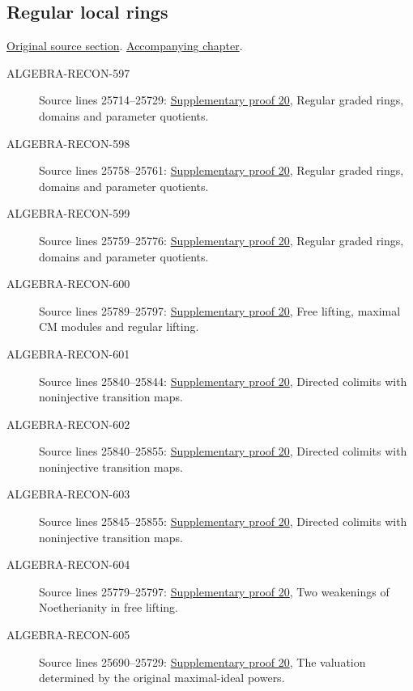\subsection{Regular local rings}
\hypertarget{algebra-source-section-regular}{}
\noindent\href{https://github.com/stacks/stacks-project/blob/a04446e57ec1fbc252a871afcec7752fb2807b14/algebra.tex\#L25679}{Original source section}. \href{algebra.pdf\#nameddest=section-regular}{Accompanying chapter}.

\begin{description}
\item[ALGEBRA-RECON-597] Source lines 25714--25729: \hyperlink{algebra_catenary_regular_notes_20260928}{Supplementary proof 20}, Regular graded rings, domains and parameter quotients.
\item[ALGEBRA-RECON-598] Source lines 25758--25761: \hyperlink{algebra_catenary_regular_notes_20260928}{Supplementary proof 20}, Regular graded rings, domains and parameter quotients.
\item[ALGEBRA-RECON-599] Source lines 25759--25776: \hyperlink{algebra_catenary_regular_notes_20260928}{Supplementary proof 20}, Regular graded rings, domains and parameter quotients.
\item[ALGEBRA-RECON-600] Source lines 25789--25797: \hyperlink{algebra_catenary_regular_notes_20260928}{Supplementary proof 20}, Free lifting, maximal CM modules and regular lifting.
\item[ALGEBRA-RECON-601] Source lines 25840--25844: \hyperlink{algebra_catenary_regular_notes_20260928}{Supplementary proof 20}, Directed colimits with noninjective transition maps.
\item[ALGEBRA-RECON-602] Source lines 25840--25855: \hyperlink{algebra_catenary_regular_notes_20260928}{Supplementary proof 20}, Directed colimits with noninjective transition maps.
\item[ALGEBRA-RECON-603] Source lines 25845--25855: \hyperlink{algebra_catenary_regular_notes_20260928}{Supplementary proof 20}, Directed colimits with noninjective transition maps.
\item[ALGEBRA-RECON-604] Source lines 25779--25797: \hyperlink{algebra_catenary_regular_notes_20260928}{Supplementary proof 20}, Two weakenings of Noetherianity in free lifting.
\item[ALGEBRA-RECON-605] Source lines 25690--25729: \hyperlink{algebra_catenary_regular_notes_20260928}{Supplementary proof 20}, The valuation determined by the original maximal-ideal powers.
\end{description}

